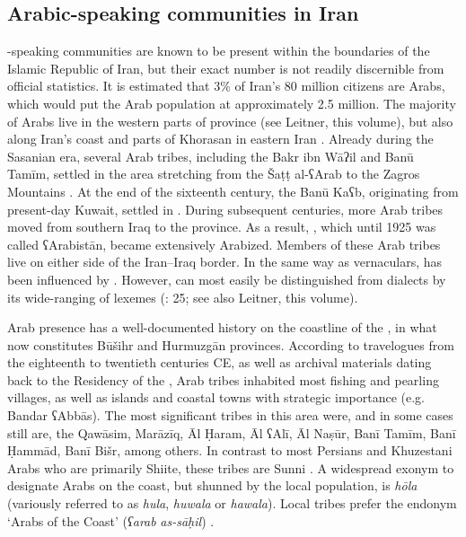 \documentclass[output=paper]{langsci/langscibook}
\begin{document}
\subsection{Arabic-speaking communities in Iran}
-speaking communities are known to be present within the boundaries of the Islamic Republic of Iran, but their exact number is not readily discernible from official statistics. It is estimated that 3\% of Iran’s 80 million citizens are Arabs, which would put the Arab population at approximately 2.5 million. The majority of Arabs live in the western parts of  province (see Leitner, this volume), but also along Iran’s   coast and parts of Khorasan in eastern Iran \citep{Oberling2011}. Already during the Sasanian era, several Arab tribes, including the Bakr ibn Wāʔil and Banū Tamīm, settled in the area stretching from the Šaṭṭ al-ʕArab to the Zagros Mountains \citep{Daniel2011}. At the end of the sixteenth century, the Banū Kaʕb, originating from present-day Kuwait, settled in . During subsequent centuries, more Arab tribes moved from southern Iraq to the province. As a result, , which until 1925 was called ʕArabistān, became extensively Arabized. Members of these Arab tribes live on either side of the Iran–Iraq border. In the same way as   vernaculars,   has been influenced by . However,   can most easily be distinguished from  dialects by its wide-ranging  of  lexemes (\citealt{Ingham1997}: 25; see also Leitner, this volume).

Arab presence has a well-documented history on the  coastline of the  , in what now constitutes Būšihr and Hurmuzgān provinces. According to travelogues from the eighteenth to twentieth centuries CE, as well as  archival materials dating back to the  Residency of the  , Arab tribes inhabited most fishing and pearling villages, as well as islands and coastal towns with strategic importance (e.g. Bandar ʕAbbās). The most significant tribes in this area were, and in some cases still are, the Qawāsim, Marāzīq, Āl Ḥaram, Āl ʕAlī, Āl Naṣūr, Banī Tamīm, Banī Ḥammād, Banī Bišr, among others. In contrast to most Persians and Khuzestani Arabs who are primarily Shiite, these tribes are Sunni . A widespread exonym to designate Arabs on the  coast, but shunned by the local population, is \textit{hōla} (variously referred to as \textit{hula}, \textit{huwala} or \textit{hawala}). Local tribes prefer the endonym ‘Arabs of the Coast’ (\textit{ʕarab} \textit{as-sāḥil}) \citep[110]{Gazsi2017}.
\end{document}

